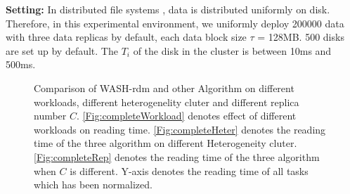 \documentclass[conference]{IEEEtran}
\begin{document}
\textbf{Setting:}
In distributed file systems \cite{b19}, data is distributed uniformly on disk. Therefore, in this experimental environment, we uniformly deploy 200000 data with three data replicas by default, each data block size $\tau$ = 128MB. 500 disks are set up by default. The $T_i$ of the disk in the cluster is between 10ms and 500ms. 
\begin{figure}[!t]
	\centering
	\quad\quad %
	\quad\quad
	\vspace{-1ex}
	\caption{Comparison of WASH-rdm and other Algorithm on different workloads, different heterogenelity cluter and different replica number $C$. \ref{Fig:completeWorkload} denotes effect of different workloads on reading time. \ref{Fig:completeHeter} denotes the reading time of the three algorithm on different Heterogeneity cluter. \ref{Fig:completeRep} denotes the reading time of the three algorithm when $C$ is different. Y-axis denotes the reading time of all tasks which has been normalized.}
	\label{Fig:complete}
	\vspace{-3ex}
\end{figure}
\end{document}
